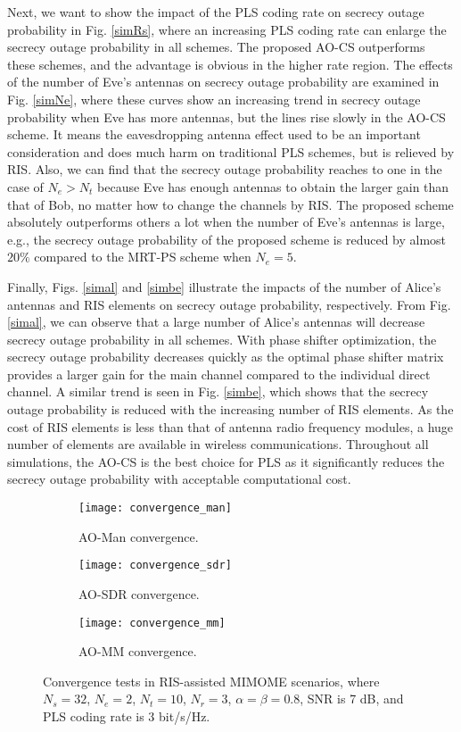 \documentclass[journal]{IEEEtran}
\theoremstyle{definition}
\begin{document}
Next, we want to show the impact of the PLS coding rate on secrecy outage probability in Fig. \ref{simRs}, where an increasing PLS coding rate can enlarge the secrecy outage probability in all schemes. The proposed AO-CS outperforms these schemes, and the advantage is obvious in the higher rate region. The effects of the number of Eve's antennas on secrecy outage probability are examined in Fig. \ref{simNe}, where these curves show an increasing trend in secrecy outage probability when Eve has more antennas, but the lines rise slowly in the AO-CS scheme. It means the eavesdropping antenna effect used to be an important consideration and does much harm on traditional PLS schemes, but is relieved by RIS. Also, we can find that the secrecy outage probability reaches to one in the case of $N_e>N_t$ because Eve has enough antennas to obtain the larger gain than that of Bob, no matter how to change the channels by RIS. The proposed scheme absolutely outperforms others a lot when the number of Eve's antennas is large, e.g., the secrecy outage probability of the proposed scheme is reduced by almost $20\%$ compared to the MRT-PS scheme when $N_e=5$.

Finally, Figs. \ref{simal} and \ref{simbe} illustrate the impacts of the number of Alice's antennas and RIS elements on secrecy outage probability, respectively. From Fig. \ref{simal}, we can observe that a large number of Alice's antennas will decrease secrecy outage probability in all schemes. With phase shifter optimization, the secrecy outage probability decreases quickly as the optimal phase shifter matrix provides a larger gain for the main channel compared to the individual direct channel. A similar trend is seen in Fig. \ref{simbe}, which shows that the secrecy outage probability is reduced with the increasing number of RIS elements. As the cost of RIS elements is less than that of antenna radio frequency modules, a huge number of elements are available in wireless communications. Throughout all simulations, the AO-CS is the best choice for PLS as it significantly reduces the secrecy outage probability with acceptable computational cost.

\begin{figure*}[h!]
\begin{subfigure}[t]{.32\textwidth}
\centering
\texttt{[image: convergence\_man]}
\caption{AO-Man convergence.}
\end{subfigure}\hfill
\begin{subfigure}[t]{.32\textwidth}
\centering
\texttt{[image: convergence\_sdr]}
\caption{AO-SDR convergence.}
\end{subfigure}
\begin{subfigure}[t]{.32\textwidth}
\centering
\texttt{[image: convergence\_mm]}
\caption{AO-MM convergence.}
\end{subfigure}
\caption{Convergence tests in RIS-assisted MIMOME scenarios, where $N_s=32$, $N_e=2$, $N_t=10$, $N_r=3$, $\alpha=\beta=0.8$, SNR is 7 dB, and PLS coding rate is 3 bit/s/Hz.}\label{convergence_sim2}
\end{figure*}
\end{document}
